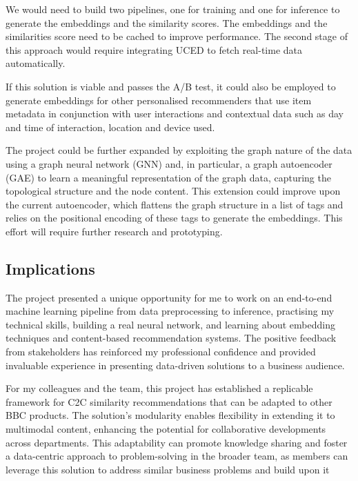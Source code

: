 We would need to build two pipelines, one for training and one for inference to generate the embeddings and the similarity scores.
The embeddings and the similarities score need to be cached to improve performance.
The second stage of this approach would require integrating UCED to fetch real-time data automatically.

If this solution is viable and passes the A/B test,
it could also be employed to generate embeddings for other personalised recommenders that use item metadata
in conjunction with user interactions and contextual data such as day and time of interaction, location and device used.

The project could be further expanded by exploiting the graph nature of the data using a graph neural network (GNN) and,
in particular, a graph autoencoder (GAE) to learn a meaningful representation of the graph data,
capturing the topological structure and the node content.
This extension could improve upon the current autoencoder,
which flattens the graph structure in a list of tags and relies on the positional encoding of these tags to generate the embeddings.
This effort will require further research and prototyping.

\subsection{Implications}

The project presented a unique opportunity for me to work on an end-to-end machine learning pipeline from data preprocessing to inference,
practising my technical skills, building a real neural network,
and learning about embedding techniques and content-based recommendation systems.
The positive feedback from stakeholders has reinforced my professional confidence and provided invaluable experience
in presenting data-driven solutions to a business audience.

For my colleagues and the team, this project has established a replicable framework for C2C similarity recommendations
that can be adapted to other BBC products. The solution's modularity enables flexibility in
extending it to multimodal content, enhancing the potential for collaborative developments across departments.
This adaptability can promote knowledge sharing and foster a data-centric approach to problem-solving in the broader team,
as members can leverage this solution to address similar business problems and build upon it

